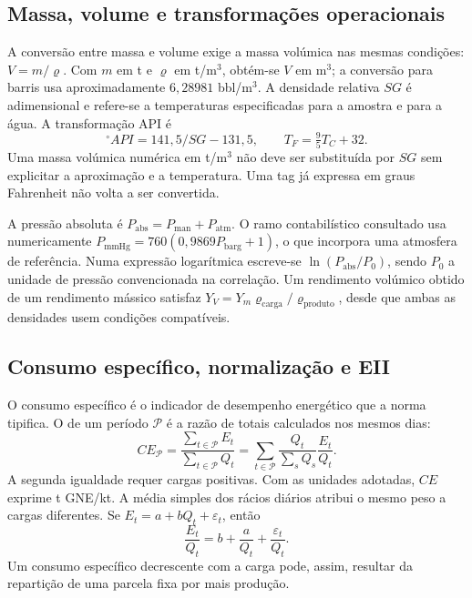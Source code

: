 \subsection{Massa, volume e transformações operacionais}
\label{sec:mat-transformacoes}
A conversão entre massa e volume exige a massa volúmica nas mesmas condições: $V=m/\varrho$. Com $m$ em t e $\varrho$ em t/m$^3$, obtém-se $V$ em m$^3$; a conversão para barris usa aproximadamente $6{,}28981$ bbl/m$^3$. A densidade relativa $SG$ é adimensional e refere-se a temperaturas especificadas para a amostra e para a água. A transformação API é
\begin{equation}
{}^{\circ}\!API=141{,}5/SG-131{,}5,
\qquad T_F=\tfrac95T_C+32.
\label{eq:mat-api-temperatura}
\end{equation}
Uma massa volúmica numérica em t/m$^3$ não deve ser substituída por $SG$ sem explicitar a aproximação e a temperatura. Uma tag já expressa em graus Fahrenheit não volta a ser convertida.

A pressão absoluta é $P_{\mathrm{abs}}=P_{\mathrm{man}}+P_{\mathrm{atm}}$. O ramo contabilístico consultado usa numericamente $P_{\mathrm{mmHg}}=760(0{,}9869P_{\mathrm{barg}}+1)$, o que incorpora uma atmosfera de referência. Numa expressão logarítmica escreve-se $\ln(P_{\mathrm{abs}}/P_0)$, sendo $P_0$ a unidade de pressão convencionada na correlação. Um rendimento volúmico obtido de um rendimento mássico satisfaz $Y_V=Y_m\varrho_{\mathrm{carga}}/\varrho_{\mathrm{produto}}$, desde que ambas as densidades usem condições compatíveis.

\subsection{Consumo específico, normalização e EII}
\label{sec:mat-indicadores}
O consumo específico é o indicador de desempenho energético que a norma tipifica. O de um período $\mathcal P$ é a razão de totais calculados nos mesmos dias:
\begin{equation}
CE_{\mathcal P}=\frac{\sum_{t\in\mathcal P}E_t}{\sum_{t\in\mathcal P}Q_t}
=\sum_{t\in\mathcal P}\frac{Q_t}{\sum_sQ_s}\frac{E_t}{Q_t}.
\label{eq:mat-consumo-especifico}
\end{equation}
A segunda igualdade requer cargas positivas. Com as unidades adotadas, $CE$ exprime t GNE/kt. A média simples dos rácios diários atribui o mesmo peso a cargas diferentes. Se $E_t=a+bQ_t+\varepsilon_t$, então
\begin{equation}
\frac{E_t}{Q_t}=b+\frac{a}{Q_t}+\frac{\varepsilon_t}{Q_t}.
\label{eq:mat-racio-carga}
\end{equation}
Um consumo específico decrescente com a carga pode, assim, resultar da repartição de uma parcela fixa por mais produção.

